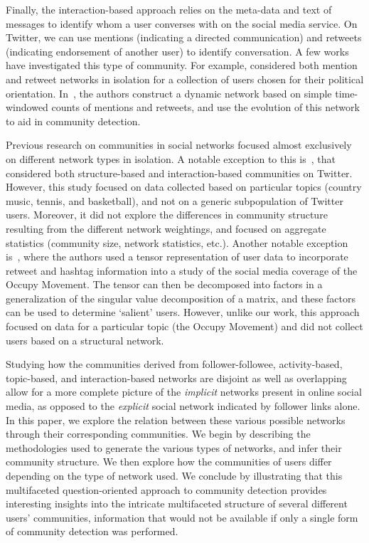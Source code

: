 Finally, the interaction-based approach relies on the meta-data and text of messages to identify whom a user converses with on the social media service. On Twitter, we can use mentions (indicating a directed communication) and retweets (indicating endorsement of another user) to identify conversation. 
A few works have investigated this type of community. For example, \cite{conover2011political} considered both mention and retweet networks in isolation for a collection of users chosen for their political orientation. In~\cite{deitrick2013mutually}, the authors construct a dynamic network based on simple time-windowed counts of mentions and retweets, and use the evolution of this network to aid in community detection.

Previous research on communities in social networks focused almost exclusively on different network types in isolation.
A notable exception to this is~\cite{lim2012tweets}, that considered both structure-based and interaction-based communities on Twitter. However, this study focused on data collected based on particular topics (country music, tennis, and basketball), and not on a generic subpopulation of Twitter users. Moreover, it did not explore the differences in community structure resulting from the different network weightings, and focused on aggregate statistics (community size, network statistics, etc.). Another notable exception is~\cite{kao2013talison}, where the authors used a tensor representation of user data to incorporate retweet and hashtag information into a study of the social media coverage of the Occupy Movement. The tensor can then be decomposed into factors in a generalization of the singular value decomposition of a matrix, and these factors can be used to determine `salient' users. However, unlike our work, this approach focused on data for a particular topic (the Occupy Movement) and did not collect users based on a structural network.

Studying how the communities derived from follower-followee, activity-based, topic-based, and interaction-based networks are disjoint as well as overlapping allow for a more complete picture of the \emph{implicit} networks present in online social media, as opposed to the \emph{explicit} social network indicated by follower links alone. In this paper, we explore the relation between these various possible networks through their corresponding communities. We begin by describing the methodologies used to generate the various types of networks, and infer their community structure.  We then explore how the communities of users differ depending on the type of network used.
We conclude by illustrating that this multifaceted question-oriented approach to community detection provides interesting insights into the intricate multifaceted structure of several different users' communities, information that would not be available if only a single form of community detection was performed. 

